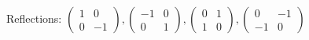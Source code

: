 \begin{example}
Reflections: $\begin{pmatrix}  %
1 & 0 \\ 0 & -1	\end{pmatrix}
, \begin{pmatrix}  %
-1 & 0 \\ 0& 1	
\end{pmatrix}
, 
\begin{pmatrix}		%
0 & 1 \\ 1 & 0     %
\end{pmatrix}
,
\begin{pmatrix}  %
0 & -1 \\ -1& 0	 %
\end{pmatrix}$
\end{example}


 
 
 


 
 



